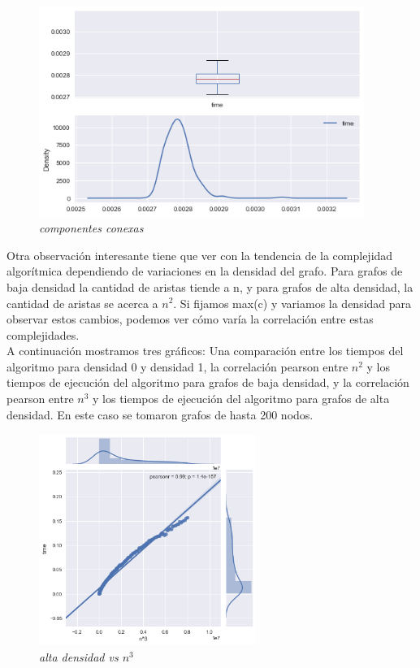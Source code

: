 \begin{figure}[!htb!]
	\begin{center}
		\includegraphics[width=300pt]{Imagenes/componentes_conexas.png}
		\caption{{\small \textit{componentes conexas}}}
	\end{center}
\end{figure}

Otra observación interesante tiene que ver con la tendencia de la complejidad algorítmica dependiendo de variaciones en la densidad del grafo. Para grafos de baja densidad la cantidad de aristas tiende a n, y para grafos de alta densidad, la cantidad de aristas se acerca a $n^{2}$. Si fijamos max(c) y variamos la densidad para observar estos cambios, podemos ver cómo varía la correlación entre estas complejidades. \\
A continuación mostramos tres gráficos: Una comparación entre los tiempos del algoritmo para densidad 0 y densidad 1, la correlación pearson entre $n^{2}$ y los tiempos de ejecución del algoritmo para grafos de baja densidad, y la correlación pearson entre $n^{3}$ y los tiempos de ejecución del algoritmo para grafos de alta densidad. En este caso se tomaron grafos de hasta 200 nodos.
\\
\begin{figure}[!htb!]
	\begin{center}
		\includegraphics[width=200pt]{Imagenes/high_density_vs_n3.png}
		\caption{{\small \textit{alta densidad vs $n^{3}$}}}
	\end{center}
\end{figure}

